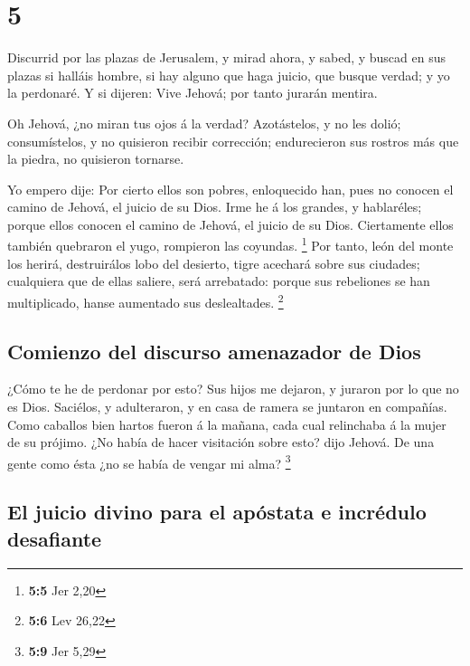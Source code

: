 \hypertarget{section-4}{%
\section{5}\label{section-4}}

 Discurrid por las plazas de Jerusalem, y mirad ahora, y
sabed, y buscad en sus plazas si halláis hombre, si hay alguno que haga
juicio, que busque verdad; y yo la perdonaré.  Y si
dijeren: Vive Jehová; por tanto jurarán mentira.

 Oh Jehová, ¿no miran tus ojos á la verdad? Azotástelos, y
no les dolió; consumístelos, y no quisieron recibir corrección;
endurecieron sus rostros más que la piedra, no quisieron tornarse.

 Yo empero dije: Por cierto ellos son pobres, enloquecido
han, pues no conocen el camino de Jehová, el juicio de su Dios.
 Irme he á los grandes, y hablaréles; porque ellos conocen
el camino de Jehová, el juicio de su Dios. Ciertamente ellos también
quebraron el yugo, rompieron las coyundas. \footnote{\textbf{5:5} Jer
  2,20}  Por tanto, león del monte los herirá,
destruirálos lobo del desierto, tigre acechará sobre sus ciudades;
cualquiera que de ellas saliere, será arrebatado: porque sus rebeliones
se han multiplicado, hanse aumentado sus deslealtades. \footnote{\textbf{5:6}
  Lev 26,22}

\hypertarget{comienzo-del-discurso-amenazador-de-dios}{%
\subsection{Comienzo del discurso amenazador de
Dios}\label{comienzo-del-discurso-amenazador-de-dios}}

 ¿Cómo te he de perdonar por esto? Sus hijos me dejaron, y
juraron por lo que no es Dios. Saciélos, y adulteraron, y en casa de
ramera se juntaron en compañías.  Como caballos bien
hartos fueron á la mañana, cada cual relinchaba á la mujer de su
prójimo.  ¿No había de hacer visitación sobre esto? dijo
Jehová. De una gente como ésta ¿no se había de vengar mi alma?
\footnote{\textbf{5:9} Jer 5,29}

\hypertarget{el-juicio-divino-para-el-apuxf3stata-e-incruxe9dulo-desafiante}{%
\subsection{El juicio divino para el apóstata e incrédulo
desafiante}\label{el-juicio-divino-para-el-apuxf3stata-e-incruxe9dulo-desafiante}}

